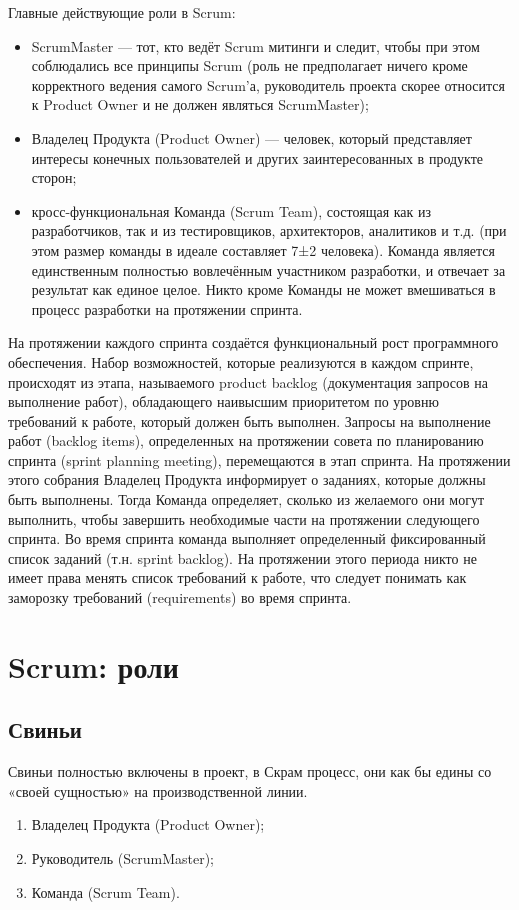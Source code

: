 \documentclass{article}
\let\stdsection\section
\renewcommand\section{\newpage\stdsection}
\begin{document}
    Главные действующие роли в Scrum: 
    \begin{itemize}
        \item ScrumMaster — тот, кто ведёт Scrum митинги и следит, чтобы при этом соблюдались все принципы Scrum (роль не предполагает ничего кроме корректного ведения самого Scrum'а, руководитель проекта скорее относится к Product Owner и не должен являться ScrumMaster);
        \item Владелец Продукта (Product Owner) — человек, который представляет интересы конечных пользователей и других заинтересованных в продукте сторон;
        \item кросс-функциональная Команда (Scrum Team), состоящая как из разработчиков, так и из тестировщиков, архитекторов, аналитиков и т.д. (при этом размер команды в идеале составляет 7±2 человека). Команда является единственным полностью вовлечённым участником разработки, и отвечает за результат как единое целое. Никто кроме Команды не может вмешиваться в процесс разработки на протяжении спринта.
    \end{itemize}

    На протяжении каждого спринта создаётся функциональный рост программного обеспечения. Набор возможностей, которые реализуются в каждом спринте, происходят из этапа, называемого product backlog (документация запросов на выполнение работ), обладающего наивысшим приоритетом по уровню требований к работе, который должен быть выполнен. Запросы на выполнение работ (backlog items), определенных на протяжении совета по планированию спринта (sprint planning meeting), перемещаются в этап спринта. На протяжении этого собрания Владелец Продукта информирует о заданиях, которые должны быть выполнены. Тогда Команда определяет, сколько из желаемого они могут выполнить, чтобы завершить необходимые части на протяжении следующего спринта. Во время спринта команда выполняет определенный фиксированный список заданий (т.н. sprint backlog). На протяжении этого периода никто не имеет права менять список требований к работе, что следует понимать как заморозку требований (requirements) во время спринта.

\section{Scrum: роли}
    \subsection{Свиньи}
    Свиньи полностью включены в проект, в Скрам процесс, они как бы едины со «своей сущностью» на производственной линии.
    \begin{enumerate}
        \item Владелец Продукта (Product Owner);
        \item Руководитель (ScrumMaster);
        \item Команда (Scrum Team).
    \end{enumerate}
\end{document}
